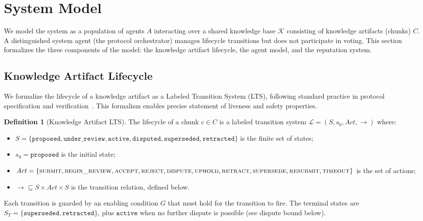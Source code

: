 \documentclass[11pt]{article}
\begin{document}
\section{System Model}

We model the system as a population of agents $A$ interacting over a shared knowledge base $\mathcal{K}$ consisting of knowledge artifacts (chunks) $C$. A distinguished system agent (the protocol orchestrator) manages lifecycle transitions but does not participate in voting. This section formalizes the three components of the model: the knowledge artifact lifecycle, the agent model, and the reputation system.

\subsection{Knowledge Artifact Lifecycle}

We formalize the lifecycle of a knowledge artifact as a Labeled Transition System (LTS), following standard practice in protocol specification and verification~\cite{keller1976, lamport2002}. This formalism enables precise statement of liveness and safety properties.

\textbf{Definition 1} (Knowledge Artifact LTS). The lifecycle of a chunk $c \in C$ is a labeled transition system $\mathcal{L} = (S, s_0, \mathit{Act}, \rightarrow)$ where:

\begin{itemize}
\item $S = \{\texttt{proposed}, \texttt{under\_review}, \texttt{active}, \texttt{disputed}, \texttt{superseded}, \texttt{retracted}\}$ is the finite set of states;
\item $s_0 = \texttt{proposed}$ is the initial state;
\item $\mathit{Act} = \{\textsc{submit}, \textsc{begin\_review}, \textsc{accept}, \textsc{reject}, \textsc{dispute}, \textsc{uphold}, \textsc{retract}, \textsc{supersede}, \textsc{resubmit}, \textsc{timeout}\}$ is the set of actions;
\item $\rightarrow \subseteq S \times \mathit{Act} \times S$ is the transition relation, defined below.
\end{itemize}

Each transition is guarded by an enabling condition $G$ that must hold for the transition to fire. The terminal states are $S_T = \{\texttt{superseded}, \texttt{retracted}\}$, plus $\texttt{active}$ when no further dispute is possible (see dispute bound below).
\end{document}
